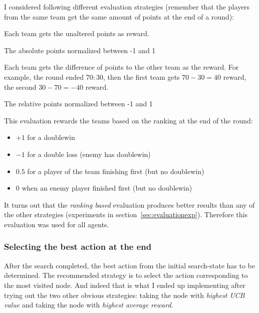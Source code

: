 I considered following different evaluation strategies (remember that the players from the same team get the same amount of points at the end of a round):
\begin{description}
    \vspace{-10px}
    \item[Absolute Points,] Each team gets the unaltered points as reward.
    \item[Absolute Normalized Points,] The absolute points normalized between -1 and 1
    \item[Relative Points,] Each team gets the difference of points to the other team as the reward. For example, the round ended $70:30$, then the first team gets $70 - 30 = 40$ reward, the second $30 - 70 = -40$ reward.
    \item[Relative Normalized Points,] The relative points normalized between -1 and 1
    \item[Ranking Based,] This evaluation rewards the teams based on the ranking at the end of the round:
        \begin{itemize}
            \vspace{-10px}
            \item $+1$ for a doublewin
            \item $-1$ for a double loss (enemy has doublewin)
            \item $0.5$ for a player of the team finishing first (but no doublewin)
            \item $0$ when an enemy player finished first (but no doublewin)
        \end{itemize}
\end{description}

It turns out that the \textit{ranking based} evaluation produces better results than any of the other strategies (experiments in section~\ref{sec:evaluationexp}). Therefore this evaluation was used for all agents.

\subsubsection{Selecting the best action at the end}
After the search completed, the best action from the initial search-state has to be determined.
The recommended strategy is to select the action corresponding to the most visited node. And indeed that is what I ended up implementing after trying out the two other obvious strategies: taking the node with \textit{highest UCB value} and taking the node with \textit{highest average reward}.

